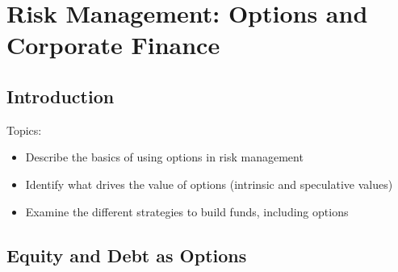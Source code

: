 \chapter{Risk Management: Options and Corporate Finance}

\section{Introduction}

Topics:
\begin{itemize}
    \item Describe the basics of using options in risk management
    \item Identify what drives the value of options (intrinsic and speculative values)
    \item Examine the different strategies to build funds, including options
\end{itemize}

\section{Equity and Debt as Options}


